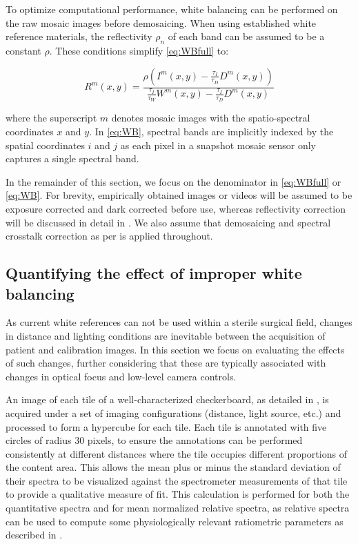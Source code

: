 To optimize computational performance, white balancing can be performed on the raw mosaic images before demosaicing. When using established white reference materials, the reflectivity $\rho_n$ of each band can be assumed to be a constant $\rho$. These conditions simplify \eqref{eq:WBfull} to:
%
\begin{linenomath*}
\begin{equation}
    R^m(x,y) = \frac{\rho\left(I^m(x,y) - \frac{\tau_I}{\tau_D}D^m(x,y)\right)}{\frac{\tau_I}{\tau_W}W^m(x,y) - \frac{\tau_I}{\tau_D}D^m(x,y)}
\label{eq:WB}
\end{equation}
\end{linenomath*}
where the superscript $m$ denotes mosaic images with the spatio-spectral coordinates $x$ and $y$.
In \eqref{eq:WB}, spectral bands are implicitly indexed by the spatial coordinates $i$ and $j$ as each pixel in a snapshot mosaic sensor only captures a single spectral band.

In the remainder of this section, we focus on the denominator in \eqref{eq:WBfull} or \eqref{eq:WB}.
For brevity, empirically obtained images or videos will be assumed to be exposure corrected and dark corrected before use, whereas reflectivity correction will be discussed in detail in .
We also assume that demosaicing and spectral crosstalk correction as per \cite{Pichette2017} is applied throughout.

%
\subsection{Quantifying the effect of improper white balancing}
\label{methodmotivation}
%
As current white references 
%
can not be used within
a sterile surgical field, changes in distance and lighting conditions are inevitable between the acquisition of patient and calibration images. 
%
In this section we focus on evaluating the effects of such changes, further considering that these are typically associated with changes in optical focus and low-level camera controls.
%

An image of each tile of a well-characterized checkerboard, as detailed in , is acquired under a set of imaging configurations (distance, light source, etc.) and processed to form a hypercube for each tile.
%
Each tile is annotated with five circles of radius 30 pixels, to ensure the annotations can be performed consistently at different distances where the tile occupies different proportions of the content area. This allows the mean plus or minus the standard deviation of their spectra to be visualized against the spectrometer measurements of that tile to provide a qualitative measure of fit.
This calculation is performed for both the quantitative spectra and for mean normalized relative spectra, as relative spectra can be used to compute some physiologically relevant ratiometric parameters as described in . 

